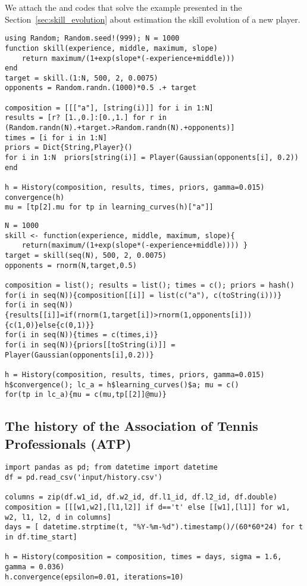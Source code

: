 \documentclass[article]{jss}
\begin{document}
We attach the  and  codes that solve the example presented in the Section~\ref{sec:skill_evolution} about estimation the skill evolution of a new player. 
%
\begin{lstlisting}[captionpos=b,backgroundcolor=\color{julia!60},caption={Skill evolution example using \proglang{Julia}.}, belowskip=0cm]
using Random; Random.seed!(999); N = 1000
function skill(experience, middle, maximum, slope)
    return maximum/(1+exp(slope*(-experience+middle))) 
end
target = skill.(1:N, 500, 2, 0.0075)
opponents = Random.randn.(1000)*0.5 .+ target

composition = [[["a"], [string(i)]] for i in 1:N]
results = [r? [1.,0.]:[0.,1.] for r in (Random.randn(N).+target.>Random.randn(N).+opponents)]
times = [i for i in 1:N]
priors = Dict{String,Player}()
for i in 1:N  priors[string(i)] = Player(Gaussian(opponents[i], 0.2))  end

h = History(composition, results, times, priors, gamma=0.015)
convergence(h)
mu = [tp[2].mu for tp in learning_curves(h)["a"]]
\end{lstlisting}
%
\begin{lstlisting}[captionpos=b,backgroundcolor=\color{r!50},caption={Skill evolution example using \proglang{R}.},belowskip=0cm]
N = 1000
skill <- function(experience, middle, maximum, slope){
    return(maximum/(1+exp(slope*(-experience+middle)))) }
target = skill(seq(N), 500, 2, 0.0075)
opponents = rnorm(N,target,0.5)

composition = list(); results = list(); times = c(); priors = hash()
for(i in seq(N)){composition[[i]] = list(c("a"), c(toString(i)))}
for(i in seq(N)){results[[i]]=if(rnorm(1,target[i])>rnorm(1,opponents[i])){c(1,0)}else{c(0,1)}}
for(i in seq(N)){times = c(times,i)}
for(i in seq(N)){priors[[toString(i)]] = Player(Gaussian(opponents[i],0.2))}
    
h = History(composition, results, times, priors, gamma=0.015)
h$convergence(); lc_a = h$learning_curves()$a; mu = c()
for(tp in lc_a){mu = c(mu,tp[[2]]@mu)}
\end{lstlisting}

\subsection{The history of the Association of Tennis Professionals (ATP)} \label{sec:appendix_atp_code}

\begin{lstlisting}[captionpos=b,backgroundcolor=\color{python!60},caption={The history of the Association of Tennis Professionals using \proglang{Python}.},belowskip=0cm]
import pandas as pd; from datetime import datetime
df = pd.read_csv('input/history.csv')

columns = zip(df.w1_id, df.w2_id, df.l1_id, df.l2_id, df.double)
composition = [[[w1,w2],[l1,l2]] if d=='t' else [[w1],[l1]] for w1, w2, l1, l2, d in columns]
days = [ datetime.strptime(t, "%Y-%m-%d").timestamp()/(60*60*24) for t in df.time_start]

h = History(composition = composition, times = days, sigma = 1.6, gamma = 0.036)
h.convergence(epsilon=0.01, iterations=10)
\end{lstlisting}
\end{document}
